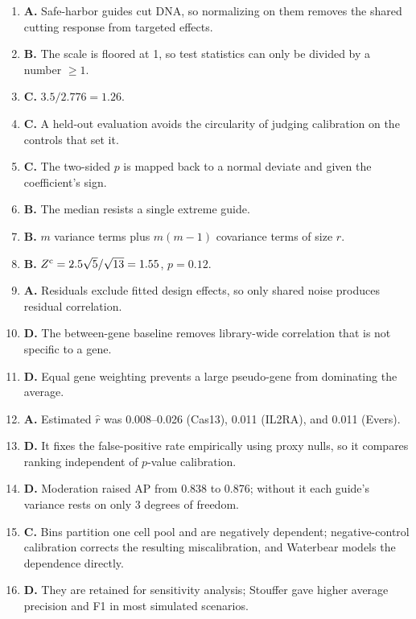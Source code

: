 \documentclass[11pt]{article}
\begin{document}
\begin{enumerate}[label=\textbf{Q\arabic*.},leftmargin=2.6em,itemsep=5pt]
\item \textbf{A.} Safe-harbor guides cut DNA, so normalizing on them removes
the shared cutting response from targeted effects.
\item \textbf{B.} The scale is floored at 1, so test statistics can only be
divided by a number $\ge1$.
\item \textbf{C.} $3.5/2.776=1.26$.
\item \textbf{C.} A held-out evaluation avoids the circularity of judging
calibration on the controls that set it.
\item \textbf{C.} The two-sided $p$ is mapped back to a normal deviate and
given the coefficient's sign.
\item \textbf{B.} The median resists a single extreme guide.
\item \textbf{B.} $m$ variance terms plus $m(m-1)$ covariance terms of size
$r$.
\item \textbf{B.} $Z^{\text c}=2.5\sqrt5/\sqrt{13}=1.55$, $p=0.12$.
\item \textbf{A.} Residuals exclude fitted design effects, so only shared
noise produces residual correlation.
\item \textbf{D.} The between-gene baseline removes library-wide
correlation that is not specific to a gene.
\item \textbf{D.} Equal gene weighting prevents a large pseudo-gene from
dominating the average.
\item \textbf{A.} Estimated $\hat r$ was 0.008--0.026 (Cas13), 0.011
(IL2RA), and 0.011 (Evers).
\item \textbf{D.} It fixes the false-positive rate empirically using proxy
nulls, so it compares ranking independent of $p$-value calibration.
\item \textbf{D.} Moderation raised AP from 0.838 to 0.876; without it each
guide's variance rests on only 3 degrees of freedom.
\item \textbf{C.} Bins partition one cell pool and are negatively dependent;
negative-control calibration corrects the resulting miscalibration, and
Waterbear models the dependence directly.
\item \textbf{D.} They are retained for sensitivity analysis; Stouffer gave
higher average precision and F1 in most simulated scenarios.
\end{enumerate}
\end{document}
